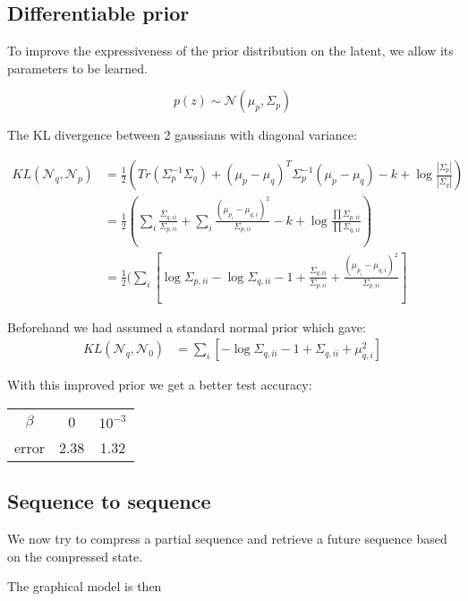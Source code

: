 \documentclass[a4paper]{article}
\begin{document}
\subsection{Differentiable prior}

To improve the expressiveness of the prior distribution on the latent, we allow its parameters to be learned. 

$$p(z) \sim \mathcal{N}(\mu_p, \Sigma_p)$$

The KL divergence between 2 gaussians with diagonal variance:

\begin{align}
KL(\mathcal{N}_q, \mathcal{N}_p) &= \frac{1}{2}(Tr(\Sigma_p^{-1}\Sigma_q) + (\mu_p - \mu_q)^T\Sigma_p^{-1}(\mu_p - \mu_q) - k + \log\frac{|\Sigma_p|}{|\Sigma_q|})\\
&= \frac{1}{2}(\sum_i \frac{\Sigma_{q, ii}}{\Sigma_{p, ii}} + \sum_i \frac{(\mu_{p_i} - \mu_{q, i})^2}{\Sigma_{p, ii}} - k + \log\frac{\prod \Sigma_{p, ii}}{\prod \Sigma_{q, ii}})\\
&= \frac{1}{2}(\sum_i[ \log \Sigma_{p, ii} - \log \Sigma_{q, ii} - 1 + \frac{\Sigma_{q, ii}}{\Sigma_{p, ii}} + \frac{(\mu_{p_i} - \mu_{q, i})^2}{\Sigma_{p, ii}}]
\end{align}

Beforehand we had assumed a standard normal prior which gave:
\begin{align}
KL(\mathcal{N}_q, \mathcal{N}_0) &= \sum_i[ -\log \Sigma_{q, ii} - 1 + \Sigma_{q, ii}+ \mu_{q, i}^2]
\end{align}

With this improved prior we get a better test accuracy:

\begin{center}
\begin{tabular}{ c | c c }
 $\beta$ & 0 & $10^{-3}$ \\ 
 error &  2.38 &  1.32 \\  
\end{tabular}
\end{center}

\subsection{Sequence to sequence}

We now try to compress a partial sequence and retrieve a future sequence based on the compressed state.

The graphical model is then

\begin{center}
\end{center}
\end{document}

